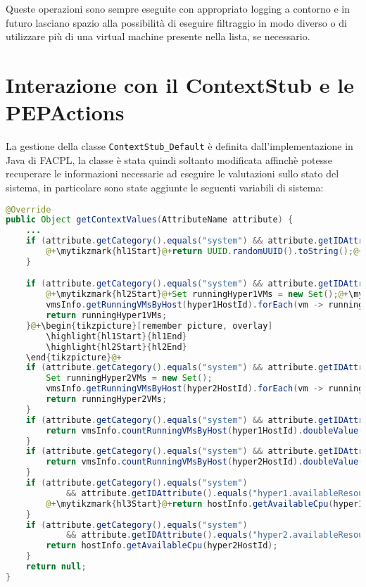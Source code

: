 Queste operazioni sono sempre eseguite con appropriato logging a contorno e in futuro lasciano spazio alla possibilità di eseguire filtraggio in modo diverso o di utilizzare più di una virtual machine presente nella lista, se necessario.

\section{Interazione con il ContextStub e le PEPActions}
La gestione della classe \texttt{ContextStub\_Default} è definita dall'implementazione in Java di FACPL, la classe è stata quindi soltanto modificata affinchè potesse recuperare le informazioni necessarie ad eseguire le valutazioni sullo stato del sistema, in particolare sono state aggiunte le seguenti variabili di sistema:
\begin{lstlisting}[language=Java, caption=Context di OpenNebula, label=code:ContextStubChoice, basicstyle=\fontsize{9}{10}\ttfamily]
@Override
public Object getContextValues(AttributeName attribute) {
    ...
    if (attribute.getCategory().equals("system") && attribute.getIDAttribute().equals("vm-name")) {
        @+\mytikzmark{hl1Start}@+return UUID.randomUUID().toString();@+\mytikzmark{hl1End}@+
    }

    if (attribute.getCategory().equals("system") && attribute.getIDAttribute().equals("hyper1.vm-names")) {
        @+\mytikzmark{hl2Start}@+Set runningHyper1VMs = new Set();@+\mytikzmark{hl2End}@+
        vmsInfo.getRunningVMsByHost(hyper1HostId).forEach(vm -> runningHyper1VMs.addValue(vm.getVmName()));
        return runningHyper1VMs;
    }@+\begin{tikzpicture}[remember picture, overlay]
        \highlight{hl1Start}{hl1End}
        \highlight{hl2Start}{hl2End}
    \end{tikzpicture}@+
    if (attribute.getCategory().equals("system") && attribute.getIDAttribute().equals("hyper2.vm-names")) {
        Set runningHyper2VMs = new Set();
        vmsInfo.getRunningVMsByHost(hyper2HostId).forEach(vm -> runningHyper2VMs.addValue(vm.getVmName()));
        return runningHyper2VMs;
    }
    if (attribute.getCategory().equals("system") && attribute.getIDAttribute().equals("hyper1.vm1-counter")) {
        return vmsInfo.countRunningVMsByHost(hyper1HostId).doubleValue();
    }
    if (attribute.getCategory().equals("system") && attribute.getIDAttribute().equals("hyper2.vm1-counter")) {
        return vmsInfo.countRunningVMsByHost(hyper2HostId).doubleValue();
    }
    if (attribute.getCategory().equals("system")
            && attribute.getIDAttribute().equals("hyper1.availableResources")) {
        @+\mytikzmark{hl3Start}@+return hostInfo.getAvailableCpu(hyper1HostId);@+\mytikzmark{hl3End}@+
    }
    if (attribute.getCategory().equals("system")
            && attribute.getIDAttribute().equals("hyper2.availableResources")) {
        return hostInfo.getAvailableCpu(hyper2HostId);
    }
    return null;
}
\end{lstlisting}
